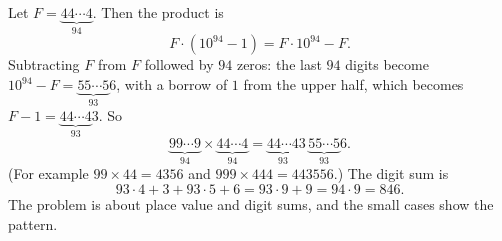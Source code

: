 Let $F=\underbrace{44\cdots4}_{94}$. Then the product is
\[
F\cdot\left(10^{94}-1\right)=F\cdot10^{94}-F .
\]
Subtracting $F$ from $F$ followed by $94$ zeros: the last $94$ digits become $10^{94}-F=\underbrace{55\cdots5}_{93}6$, with a borrow of $1$ from the upper half, which becomes $F-1=\underbrace{44\cdots4}_{93}3$. So
\[
\underbrace{99\cdots9}_{94}\times\underbrace{44\cdots4}_{94}=\underbrace{44\cdots4}_{93}3\,\underbrace{55\cdots5}_{93}6 .
\]
(For example $99\times44=4356$ and $999\times444=443556$.) The digit sum is
\[
93\cdot4+3+93\cdot5+6=93\cdot9+9=94\cdot9=\boxed{846}.
\]
The problem is about place value and digit sums, and the small cases show the pattern.
